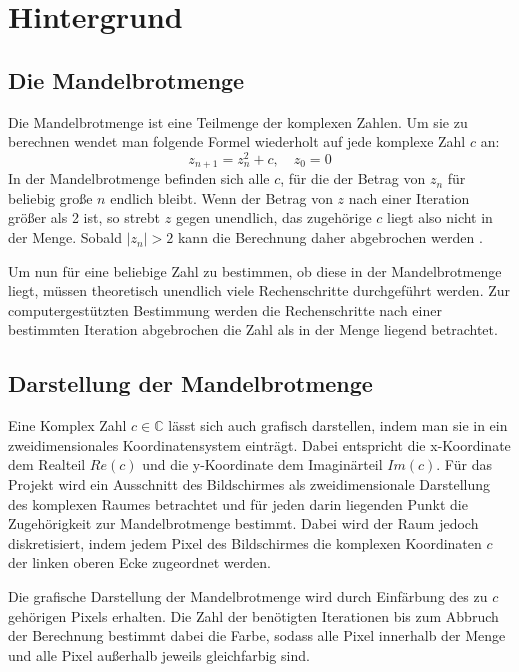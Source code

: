 \section{Hintergrund}

\subsection{Die Mandelbrotmenge}

Die Mandelbrotmenge ist eine Teilmenge der komplexen Zahlen.
Um sie zu berechnen wendet man folgende Formel wiederholt auf jede komplexe Zahl $c$ an:
\begin{equation}\label{equ:mandelbrot}
	z_{n+1} = z_{n}^2 + c, \quad z_0 = 0
\end{equation}
In der Mandelbrotmenge befinden sich alle $c$, für die der Betrag von $z_n$ für beliebig große $n$ endlich bleibt.
Wenn der Betrag von $z$ nach einer Iteration größer als 2 ist, so strebt $z$ gegen unendlich, das zugehörige $c$ liegt also nicht in der Menge.
Sobald $|z_n| > 2$ kann die Berechnung daher abgebrochen werden \cite{424331}.

Um nun für eine beliebige Zahl zu bestimmen, ob diese in der Mandelbrotmenge liegt, müssen
theoretisch unendlich viele Rechenschritte durchgeführt werden. Zur computergestützten Bestimmung
werden die Rechenschritte nach einer bestimmten Iteration abgebrochen die Zahl als in der Menge liegend betrachtet.

\subsection{Darstellung der Mandelbrotmenge}

Eine Komplex Zahl \( c \in \mathbb{C} \) lässt sich auch grafisch darstellen, indem man sie in ein zweidimensionales Koordinatensystem einträgt.
Dabei entspricht die x-Koordinate dem Realteil \( Re(c) \) und die y-Koordinate dem Imaginärteil \( Im(c) \).
Für das Projekt wird ein Ausschnitt des Bildschirmes als zweidimensionale Darstellung des komplexen Raumes
betrachtet und für jeden darin liegenden Punkt die Zugehörigkeit zur Mandelbrotmenge bestimmt.
Dabei wird der Raum jedoch diskretisiert, indem jedem Pixel des Bildschirmes die komplexen Koordinaten $c$
der linken oberen Ecke zugeordnet werden.

Die grafische Darstellung der Mandelbrotmenge wird durch Einfärbung des zu $c$ gehörigen Pixels erhalten.
Die Zahl der benötigten Iterationen bis zum Abbruch der Berechnung bestimmt dabei die Farbe, sodass alle Pixel
innerhalb der Menge und alle Pixel außerhalb jeweils gleichfarbig sind.


